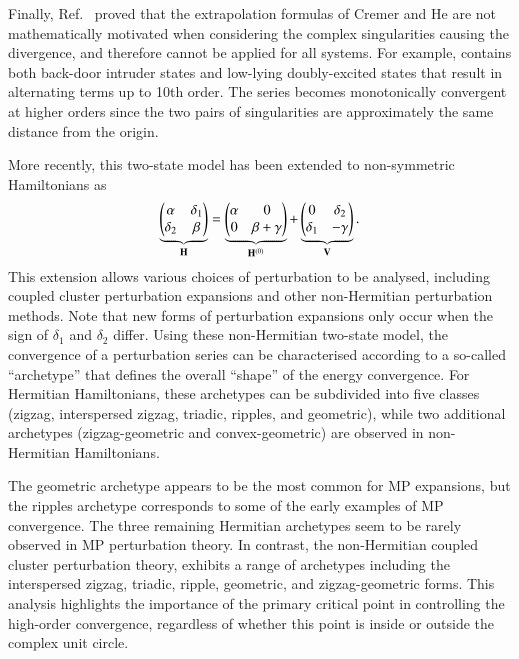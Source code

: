\documentclass[aps,prb,reprint,noshowkeys,superscriptaddress]{revtex4-1}
\newcommand{\bH}{\mathbf{H}}
\newcommand{\bV}{\mathbf{V}}
\begin{document}
Finally, Ref.~ proved that the extrapolation formulas of Cremer and He \cite{Cremer_1996}
are not mathematically motivated when considering the complex singularities causing the divergence, and therefore
cannot be applied for all systems.
For example,  contains both back-door intruder states and low-lying doubly-excited states that
result in alternating terms up to 10th order. 
The series becomes monotonically convergent at higher orders since
the two pairs of singularities are approximately the same distance from the origin.

More recently, this two-state model has been extended to non-symmetric Hamiltonians as\cite{Olsen_2019}
\begin{equation}
	\underbrace{\mqty(\alpha & \delta_1 \\ \delta_2 & \beta)}_{\bH} = \underbrace{\mqty(\alpha & 0 \\ 0 & \beta + \gamma )}_{\bH^{(0)}} + \underbrace{\mqty( 0 & \delta_2 \\ \delta_1 & - \gamma)}_{\bV}.
\end{equation}
This extension allows various choices of perturbation to be analysed, including coupled cluster 
perturbation expansions \cite{Pawlowski_2019a,Pawlowski_2019b,Pawlowski_2019c,Pawlowski_2019d,Pawlowski_2019e} 
and other non-Hermitian perturbation methods.
Note that new forms of perturbation expansions only occur when the sign of $\delta_1$ and $\delta_2$ differ.
Using these non-Hermitian two-state model, the convergence of a perturbation series can be characterised 
according to a so-called ``archetype'' that defines the overall ``shape'' of the energy convergence.\cite{Olsen_2019} 
For Hermitian Hamiltonians, these archetypes can be subdivided into five classes 
(zigzag, interspersed zigzag, triadic, ripples, and geometric), 
while two additional archetypes (zigzag-geometric and convex-geometric) are observed in non-Hermitian Hamiltonians.

The geometric archetype appears to be the most common for MP expansions,\cite{Olsen_2019} but the 
ripples archetype corresponds to some of the early examples of MP convergence. \cite{Handy_1985,Lepetit_1988,Leininger_2000}
The three remaining Hermitian archetypes seem to be rarely observed in MP perturbation theory.
In contrast, the non-Hermitian coupled cluster perturbation theory,%
\cite{Pawlowski_2019a,Pawlowski_2019b,Pawlowski_2019c,Pawlowski_2019d,Pawlowski_2019e} exhibits a range of archetypes
including the interspersed zigzag, triadic, ripple, geometric, and zigzag-geometric forms.
This analysis highlights the importance of the primary critical point in controlling the high-order convergence, 
regardless of whether this point is inside or outside the complex unit circle. \cite{Handy_1985,Olsen_2000}
\end{document}
